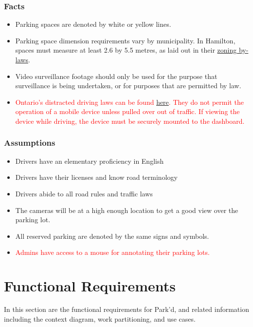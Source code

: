 \documentclass[12pt,letterpaper]{article}
\begin{document}
\subsubsection{Facts}
\begin{itemize}
    \item Parking spaces are denoted by white or yellow lines.
    \item Parking space dimension requirements vary by municipality. In
    Hamilton, spaces must measure at least 2.6 by 5.5 metres, as laid out in
    their
    \href{http://www2.hamilton.ca/NR/rdonlyres/D4866111-3F89-42C3-9594-1E7E7F3028AD/0/ZBL05200Section5Parking.pdf}{zoning
    by-laws}.
    \item Video surveillance footage should only be used for the purpose that
    surveillance is being undertaken, or for purposes that are permitted by law.
    \item \textcolor{red}{Ontario's distracted driving laws can be found
    \href{https://www.ontario.ca/page/distracted-driving}{here}. They do not
    permit the operation of a mobile device unless pulled over out of traffic.
    If viewing the device while driving, the device must be securely mounted to
    the dashboard.}
\end{itemize}
\subsubsection{Assumptions}
\begin{itemize}
    \item Drivers have an elementary proficiency in English
    \item Drivers have their licenses and know road terminology
    \item Drivers abide to all road rules and traffic laws
    \item The cameras will be at a high enough location to get a good view over
    the parking lot.
    \item All reserved parking are denoted by the same signs and symbols.
    \item \textcolor{red}{Admins have access to a mouse for annotating their
    parking lots.}
\end{itemize}

\newpage
\section{Functional Requirements}
In this section are the functional requirements for Park'd, and related
information including the context diagram, work partitioning, and use cases.
\end{document}
